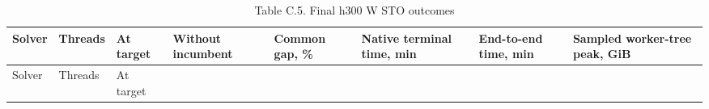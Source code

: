 \documentclass[
  english,
  11pt,
  a4paper,
]{article}
\begin{document}
\begin{longtable}[]{@{}
  >{\raggedright\arraybackslash}p{}
  >{\raggedleft\arraybackslash}p{}
  >{\raggedleft\arraybackslash}p{}
  >{\raggedleft\arraybackslash}p{}
  >{\raggedleft\arraybackslash}p{}
  >{\raggedleft\arraybackslash}p{}
  >{\raggedleft\arraybackslash}p{}
  >{\raggedleft\arraybackslash}p{}@{}}
\caption{Table C.5. Final h300 W STO outcomes}\tabularnewline
\toprule\noalign{}
\begin{minipage}[b]{\linewidth}\raggedright
Solver
\end{minipage} & \begin{minipage}[b]{\linewidth}\raggedleft
Threads
\end{minipage} & \begin{minipage}[b]{\linewidth}\raggedleft
At target
\end{minipage} & \begin{minipage}[b]{\linewidth}\raggedleft
Without incumbent
\end{minipage} & \begin{minipage}[b]{\linewidth}\raggedleft
Common gap, \%
\end{minipage} & \begin{minipage}[b]{\linewidth}\raggedleft
Native terminal time, min
\end{minipage} & \begin{minipage}[b]{\linewidth}\raggedleft
End-to-end time, min
\end{minipage} & \begin{minipage}[b]{\linewidth}\raggedleft
Sampled worker-tree peak, GiB
\end{minipage} \\
\midrule\noalign{}
\endfirsthead
\toprule\noalign{}
\begin{minipage}[b]{\linewidth}\raggedright
Solver
\end{minipage} & \begin{minipage}[b]{\linewidth}\raggedleft
Threads
\end{minipage} & \begin{minipage}[b]{\linewidth}\raggedleft
At target
\end{minipage} & \begin{minipage}[b]{\linewidth}\raggedleft

\end{minipage}
\end{longtable}
\end{document}
